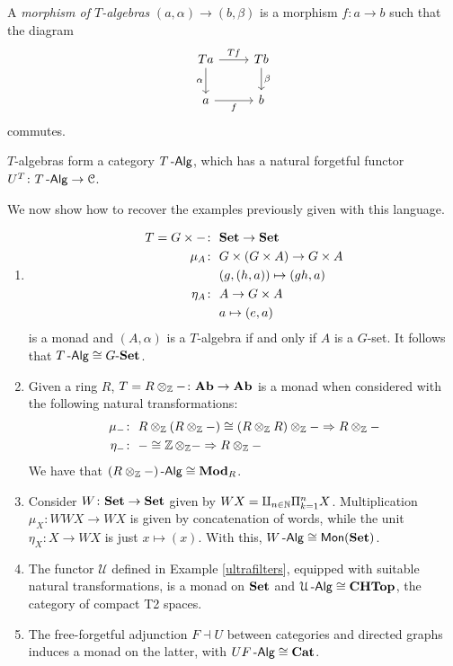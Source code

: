 \documentclass[a4paper,11pt,oneside,openany]{scrbook}
\begin{document}
\begin{defn}
	A \emph{morphism of $T$-algebras} $(a,\alpha)\rightarrow (b,\beta)$ is a morphism $f\colon a\rightarrow b$ such that the diagram
	\[
		\begin{tikzcd}
			Ta\arrow["\alpha"']{d}\arrow["Tf"]{r}
			& Tb\arrow["\beta"]{d} \\
			a\arrow["f"']{r}
			& b
		\end{tikzcd}
	\]
    commutes.
\end{defn}


$T$-algebras form a category $T\operatorname{-\mathsf{Alg}}$, which has a natural forgetful functor $U^T\colon T\operatorname{-\mathsf{Alg}}\rightarrow\operatorname{\mathcal{C}}$.

We now show how to recover the examples previously given with this language.

\begin{exmp}
	\begin{enumerate}
		\item
		      \begin{align*}
			      T=G\times - \colon & \ {\normalfont\textbf{Set}} \rightarrow{\normalfont\textbf{Set}}                      \\
			      \mu_A\colon        & \ G\times (G\times A) \rightarrow G\times A \\
			                         & \ (g,(h,a)) \mapsto (gh,a)                  \\
			      \eta_A\colon       & \ A \rightarrow G\times A                   \\
			                         & \ a \mapsto (e,a)
		      \end{align*}
		      is a monad and $(A,\alpha)$ is a $T$-algebra if and only if $A$ is a $G$-set. It follows that $T\operatorname{-\mathsf{Alg}}\cong G\mbox{-}{\normalfont\textbf{Set}}$.
		\item Given a ring $R$, $T=R\otimes_{\operatorname{\mathbb{Z}}}-\colon {\normalfont\textbf{Ab}}\rightarrow {\normalfont\textbf{Ab}}$ is a monad when considered with the following natural transformations:
		      \begin{align*}
			      \mu_{-}\colon & \ R\otimes_{\Z}(R\otimes_{\Z}-)\cong (R\otimes_{\Z}R)\otimes_{\Z}-\Rightarrow R\otimes_{\Z}- \\
			      \eta_-\colon  & \ -\cong\Z\otimes_{\Z}-\Rightarrow R\otimes_{\Z}-
		      \end{align*}
		      We have that $(R\otimes_{\operatorname{\mathbb{Z}}}-)\operatorname{-\mathsf{Alg}}\cong{\normalfont\textbf{Mod}}_R$.
		\item Consider $W\colon{\normalfont\textbf{Set}}\rightarrow{\normalfont\textbf{Set}}$ given by $WX=\amalg_{n\in\operatorname{\mathbb{N}}}\Pi_{k=1}^n X$. Multiplication $\mu_X\colon WWX\rightarrow WX$ is given by concatenation of words, while the unit $\eta_X\colon X\rightarrow WX$ is just $x\mapsto (x)$. With this, $W\operatorname{-\mathsf{Alg}}\cong \operatorname{\mathsf{Mon}}({\normalfont\textbf{Set}})$.
		\item The functor $\mathcal{U}$ defined in Example \ref{ultrafilters}, equipped with suitable natural transformations, is a monad on ${\normalfont\textbf{Set}}$ and $\mathcal{U}\operatorname{-\mathsf{Alg}}\cong {\normalfont\textbf{CHTop}}$, the category of compact T2 spaces.
		\item The free-forgetful adjunction $F\dashv U$ between categories and directed graphs induces a monad on the latter, with $UF\operatorname{-\mathsf{Alg}}\cong{\normalfont\textbf{Cat}}$.
	\end{enumerate}
\end{exmp}
\end{document}
